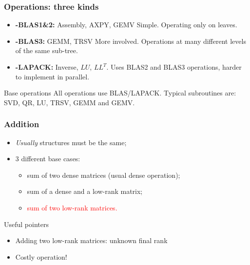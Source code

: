 \begin{frame}
\frametitle{Operations: three kinds}

\begin{itemize}
  \item \textbf{\hh-BLAS1\&2:} Assembly, AXPY, GEMV \newline
        Simple. Operating only on leaves.
  \item \textbf{\hh-BLAS3:} GEMM, TRSV \newline 
        More involved. Operations at many different levels of the same sub-tree.
  \item \textbf{\hh-LAPACK:} Inverse, $LU$, $LL^T$.\newline
        Uses BLAS2 and BLAS3 operations, harder to implement in parallel.
\end{itemize}

\begin{block}{Base operations}
All operations use BLAS/LAPACK. Typical subroutines are: SVD, QR, 
LU, TRSV, GEMM and GEMV.
\end{block}
\end{frame}

\begin{frame}
\frametitle{Addition}
\begin{itemize}
  \item \textit{Usually} structures must be the same;
  \item 3 different base cases:
  \begin{itemize}
    \item sum of two dense matrices (usual dense operation);
    \item sum of a dense and a low-rank matrix;
    \item \textcolor{red}{sum of two low-rank matrices.}
  \end{itemize}
\end{itemize}
\begin{alert}{Useful pointers}
\begin{itemize}
\item Adding two low-rank matrices: unknown final rank
\item Costly operation!
\end{itemize}
\end{alert}
\end{frame}

